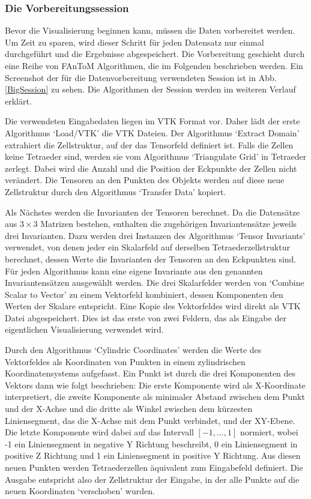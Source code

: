 \documentclass[a4paper,fontsize=12pt,toc=bib,halfparskip]{scrartcl}
\begin{document}
\subsubsection{Die Vorbereitungssession}
Bevor die Visualisierung beginnen kann, m\"ussen die Daten vorbereitet werden. Um Zeit zu sparen, wird dieser Schritt f\"ur jeden Datensatz nur einmal durchgef\"uhrt und die Ergebnisse abgespeichert. Die Vorbereitung geschieht durch eine Reihe von FAnToM Algorithmen, die im Folgenden beschrieben werden. Ein Screenshot der f\"ur die Datenvorbereitung verwendeten Session ist in Abb. \ref{BigSession} zu sehen. Die Algorithmen der Session werden im weiteren Verlauf erkl\"art.

Die verwendeten Eingabedaten liegen im VTK Format\cite{avila2010vtk} vor. Daher l\"adt der erste Algorithmus `Load/VTK' die VTK Dateien. Der Algorithmus `Extract Domain' extrahiert die Zellstruktur, auf der das Tensorfeld definiert ist. Falls die Zellen keine Tetraeder sind, werden sie vom Algorithmus `Triangulate Grid' in Tetraeder zerlegt. Dabei wird die Anzahl und die Position der Eckpunkte der Zellen nicht ver\"andert. Die Tensoren an den Punkten des Objekts werden auf diese neue Zellstruktur durch den Algorithmus `Transfer Data' kopiert. 

Als N\"achstes werden die Invarianten der Tensoren berechnet. Da die Datens\"atze aus $3\times3$ Matrizen bestehen, enthalten die zugeh\"origen Invariantens\"atze jeweils drei Invarianten. Dazu werden drei Instanzen des Algorithmus `Tensor Invariants' verwendet, von denen jeder ein Skalarfeld auf derselben Tetraederzellstruktur berechnet, dessen Werte die Invarianten der Tensoren an den Eckpunkten sind. F\"ur jeden Algorithmus kann eine eigene Invariante aus den genannten Invariantens\"atzen ausgew\"ahlt werden. Die drei Skalarfelder werden von `Combine Scalar to Vector' zu einem Vektorfeld kombiniert, dessen Komponenten den Werten der Skalare entspricht. Eine Kopie des Vektorfeldes wird direkt als VTK Datei abgespeichert. Dies ist das erste von zwei Feldern, das als Eingabe der eigentlichen Visualisierung verwendet wird.

Durch den Algorithmus `Cylindric Coordinates' werden die Werte des Vektorfeldes als Koordinaten von Punkten in einem zylindrischen Koordinatensystems aufgefasst. Ein Punkt ist durch die drei Komponenten des Vektors dann wie folgt beschrieben: Die erste Komponente wird als X-Koordinate interpretiert, die zweite Komponente als minimaler Abstand zwischen dem Punkt und der X-Achse und die dritte als Winkel zwischen dem k\"urzesten Liniensegment, das die X-Achse mit dem Punkt verbindet, und der XY-Ebene. Die letzte Komponente wird dabei auf das Intervall $[-1,\dots,1]$ normiert, wobei -1 ein Liniensegment in negative Y Richtung beschreibt, 0 ein Liniensegment in positive Z Richtung und 1 ein Liniensegment in positive Y Richtung. Aus diesen neuen Punkten werden Tetraederzellen \"aquivalent zum Eingabefeld definiert. Die Ausgabe entspricht also der Zellstruktur der Eingabe, in der alle Punkte auf die neuen Koordinaten `verschoben' wurden.
\end{document}
